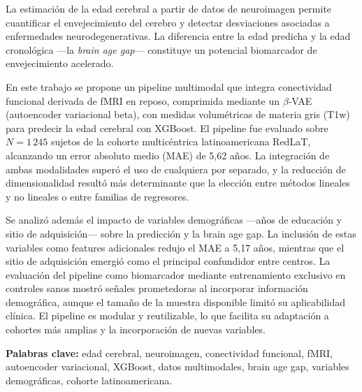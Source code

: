La estimación de la edad cerebral a partir de datos de neuroimagen permite cuantificar el envejecimiento del cerebro y detectar desviaciones asociadas a enfermedades neurodegenerativas. La diferencia entre la edad predicha y la edad cronológica ---la \textit{brain age gap}--- constituye un potencial biomarcador de envejecimiento acelerado.

En este trabajo se propone un pipeline multimodal que integra conectividad funcional derivada de fMRI en reposo, comprimida mediante un $\beta$-VAE (autoencoder variacional beta), con medidas volumétricas de materia gris (T1w) para predecir la edad cerebral con XGBoost. El pipeline fue evaluado sobre $N = 1\,245$ sujetos de la cohorte multicéntrica latinoamericana RedLaT, alcanzando un error absoluto medio (MAE) de 5,62 años. La integración de ambas modalidades superó el uso de cualquiera por separado, y la reducción de dimensionalidad resultó más determinante que la elección entre métodos lineales y no lineales o entre familias de regresores.

Se analizó además el impacto de variables demográficas ---años de educación y sitio de adquisición--- sobre la predicción y la brain age gap. La inclusión de estas variables como features adicionales redujo el MAE a 5,17 años, mientras que el sitio de adquisición emergió como el principal confundidor entre centros. La evaluación del pipeline como biomarcador mediante entrenamiento exclusivo en controles sanos mostró señales prometedoras al incorporar información demográfica, aunque el tamaño de la muestra disponible limitó su aplicabilidad clínica. El pipeline es modular y reutilizable, lo que facilita su adaptación a cohortes más amplias y la incorporación de nuevas variables.

\vspace{1em}
\noindent\textbf{Palabras clave:} edad cerebral, neuroimagen, conectividad funcional, fMRI, autoencoder variacional, XGBoost, datos multimodales, brain age gap, variables demográficas, cohorte latinoamericana.
